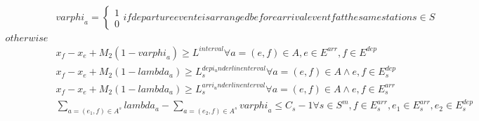 \begin{align}
  & \mathit{varphi}_{a} = \begin{cases} 1 \\ 0 \end{cases} \mathit{ifdepartureeventeisarrangedbeforearrivaleventfatthesamestations} \in S \\ o t h e r w i s e  \tag{eq\_0017} \\
  & x_{f} - x_{e} + M_{2} \left(1 - \mathit{varphi}_{a}\right) \geq L^{i n t e r v a l} \forall a = \left(e , f\right) \in A , e \in E^{a r r} , f \in E^{d e p} \tag{eq\_0018} \\
  & x_{f} - x_{e} + M_{2} \left(1 - \mathit{lambda}_{a}\right) \geq L_{s}^{d e p i_underline n t e r v a l} \forall a = \left(e , f\right) \in A \land e , f \in E_{s}^{d e p} \tag{eq\_0019} \\
  & x_{f} - x_{e} + M_{2} \left(1 - \mathit{lambda}_{a}\right) \geq L_{s}^{a r r i_underline n t e r v a l} \forall a = \left(e , f\right) \in A \land e , f \in E_{s}^{a r r} \tag{eq\_0020} \\
  & \sum_{a = \left(e_{1} , f\right) \in A^{s}} \mathit{lambda}_{a} - \sum_{a = \left(e_{2} , f\right) \in A^{s}} \mathit{varphi}_{a} \leq C_{s} - 1 \forall s \in S^{m} , f \in E_{s}^{a r r} , e_{1} \in E_{s}^{a r r} , e_{2} \in E_{s}^{d e p} \tag{eq\_0021} \\
\end{align}
